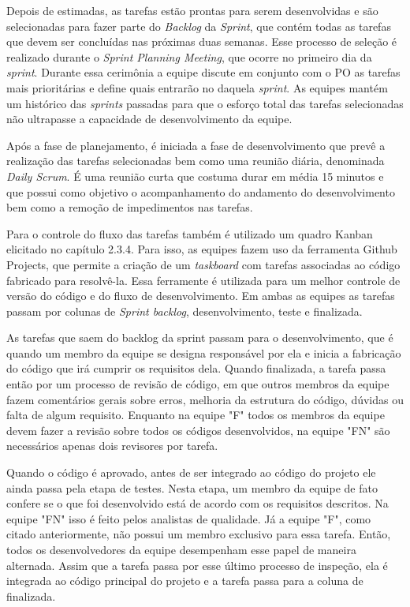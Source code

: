 \documentclass[
    12pt,       %
    openright,      %
    twoside,      %
    a4paper,      %
    english,      %
    french,       %
    spanish,      %
    brazil,       %
    ]{abntex2}
\begin{document}
Depois de estimadas, as tarefas estão prontas para serem desenvolvidas e são selecionadas para fazer parte do \textit{Backlog} da \textit{Sprint}, que contém todas as tarefas que devem ser concluídas nas próximas duas semanas. Esse processo de seleção é realizado durante o \textit{Sprint Planning Meeting}, que ocorre no primeiro dia da \textit{sprint}. Durante essa cerimônia a equipe discute em conjunto com o PO as tarefas mais prioritárias e define quais entrarão no  daquela \textit{sprint}. As equipes mantém um histórico das \textit{sprints} passadas para que o esforço total das tarefas selecionadas não ultrapasse a capacidade de desenvolvimento da equipe. 

Após a fase de planejamento, é iniciada a fase de desenvolvimento que prevê a realização das tarefas selecionadas bem como uma reunião diária, denominada \textit{Daily Scrum}. É uma reunião curta que costuma durar em média 15 minutos e que possui como objetivo o acompanhamento do andamento do desenvolvimento bem como a remoção de impedimentos nas tarefas.

Para o controle do fluxo das tarefas também é utilizado um quadro Kanban elicitado no capítulo 2.3.4. Para isso, as equipes fazem uso da ferramenta Github Projects, que permite a criação de um \textit{taskboard} com tarefas associadas ao código fabricado para resolvê-la. Essa ferramente é utilizada para um melhor controle de versão do código e do fluxo de desenvolvimento. Em ambas as equipes as tarefas passam por colunas de \textit{Sprint backlog}, desenvolvimento, teste e finalizada.

As tarefas que saem do backlog da sprint passam para o desenvolvimento, que é quando um membro da equipe se designa responsável por ela e inicia a fabricação do código que irá cumprir os requisitos dela. Quando finalizada, a tarefa passa então por um processo de revisão de código, em que outros membros da equipe fazem comentários gerais sobre erros, melhoria da estrutura do código, dúvidas ou falta de algum requisito. Enquanto na equipe "F" todos os membros da equipe devem fazer a revisão sobre todos os códigos desenvolvidos, na equipe "FN" são necessários apenas dois revisores por tarefa.

Quando o código é aprovado, antes de ser integrado ao código do projeto ele ainda passa pela etapa de testes. Nesta etapa, um membro da equipe de fato confere se o que foi desenvolvido está de acordo com os requisitos descritos. Na equipe "FN" isso é feito pelos analistas de qualidade. Já a equipe "F", como citado anteriormente, não possui um membro exclusivo para essa tarefa. Então, todos os desenvolvedores da equipe desempenham esse papel de maneira alternada. Assim que a tarefa passa por esse último processo de inspeção, ela é integrada ao código principal do projeto e a tarefa passa para a coluna de finalizada. 
\end{document}

